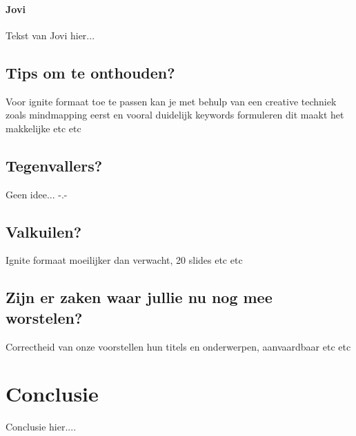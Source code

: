 \documentclass[fleqn,10pt]{voorstel}
\begin{document}
\paragraph{Jovi}
Tekst van Jovi hier...

\subsection{Tips om te onthouden?}
Voor ignite formaat toe te passen kan je met behulp van een creative techniek zoals mindmapping eerst en vooral 
duidelijk keywords formuleren dit maakt het makkelijke etc etc

\subsection{Tegenvallers?}
Geen idee... -.-

\subsection{Valkuilen?}
Ignite formaat moeilijker dan verwacht, 20 slides etc etc

\subsection{Zijn er zaken waar jullie nu nog mee worstelen?}
Correctheid van onze voorstellen hun titels en onderwerpen, aanvaardbaar etc etc

\section{Conclusie}
Conclusie hier....
\end{document}
